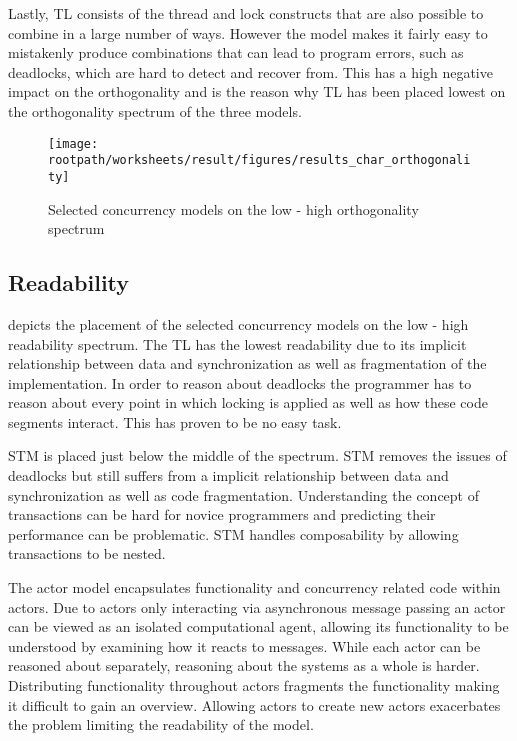 Lastly, \ac{TL} consists of the thread and lock constructs that are also possible to combine in a large number of ways. However the model makes it fairly easy to mistakenly produce combinations that can lead to program errors, such as deadlocks, which are hard to detect and recover from. This has a high negative impact on the orthogonality and is the reason why \ac{TL} has been placed lowest on the orthogonality spectrum of the three models.

\begin{figure}[htbp]
\centering
 \texttt{[image: \\rootpath/worksheets/result/figures/results\_char\_orthogonality]} 
 \caption{Selected concurrency models on the low - high orthogonality spectrum}
\label{fig:results_char_orthogonality}
\end{figure}

\subsection{Readability}
 depicts the placement of the selected concurrency models on the low - high readability spectrum. The \ac{TL} has the lowest readability due to its implicit relationship between data and synchronization as well as fragmentation of the implementation. In order to reason about deadlocks the programmer has to reason about every point in which locking is applied as well as how these code segments interact. This has proven to be no easy task.

\ac{STM} is placed just below the middle of the spectrum. \ac{STM} removes the issues of deadlocks but still suffers from a implicit relationship between data and synchronization as well as code fragmentation. Understanding the concept of transactions can be hard for novice programmers and predicting their performance can be problematic. \ac{STM} handles composability by allowing transactions to be nested. 

The actor model encapsulates functionality and concurrency related code within actors. Due to actors only interacting via asynchronous message passing an actor can be viewed as an isolated computational agent, allowing its functionality to be understood by examining how it reacts to messages. While each actor can be reasoned about separately, reasoning about the systems as a whole is harder. Distributing functionality throughout actors fragments the functionality making it difficult to gain an overview. Allowing actors to create new actors exacerbates the problem limiting the readability of the model.


